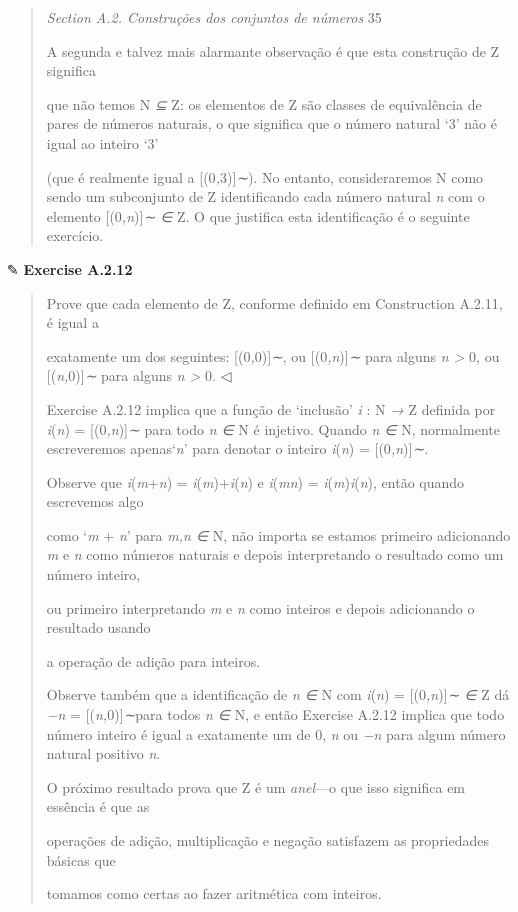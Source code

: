 \documentclass[
]{article}
\begin{document}
\begin{quote}
\emph{Section A.2. Construções dos conjuntos de números} 35

A segunda e talvez mais alarmante observação é que esta construção de Z
significa

que não temos N \emph{⊆} Z: os elementos de Z são classes de
equivalência de pares de números naturais, o que significa que o número
natural `3' não é igual ao inteiro `3'

(que é realmente igual a {[}(0\emph{,}3){]}\emph{∼}). No entanto,
consideraremos N como sendo um subconjunto de Z identificando cada
número natural \emph{n} com o elemento {[}(0\emph{,n}){]}\emph{∼ ∈} Z. O
que justifica esta identificação é o seguinte exercício.
\end{quote}

✎ \textbf{Exercise A.2.12}

\begin{quote}
Prove que cada elemento de Z, conforme definido em Construction A.2.11,
é igual a

exatamente um dos seguintes: {[}(0\emph{,}0){]}\emph{∼}, ou
{[}(0\emph{,n}){]}\emph{∼} para alguns \emph{n \textgreater{}} 0, ou
{[}(\emph{n,}0){]}\emph{∼} para alguns \emph{n \textgreater{}} 0. ◁

Exercise A.2.12 implica que a função de `inclusão' \emph{i} : N \emph{→}
Z definida por \emph{i}(\emph{n}) = {[}(0\emph{,n}){]}\emph{∼} para todo
\emph{n ∈} N é injetivo. Quando \emph{n ∈} N, normalmente escreveremos
apenas`\emph{n}' para denotar o inteiro \emph{i}(\emph{n}) =
{[}(0\emph{,n}){]}\emph{∼}.

Observe que \emph{i}(\emph{m}+\emph{n}) =
\emph{i}(\emph{m})+\emph{i}(\emph{n}) e \emph{i}(\emph{mn}) =
\emph{i}(\emph{m})\emph{i}(\emph{n}), então quando escrevemos algo

como `\emph{m} + \emph{n}' para \emph{m,n ∈} N, não importa se estamos
primeiro adicionando \emph{m} e \emph{n} como números naturais e depois
interpretando o resultado como um número inteiro,

ou primeiro interpretando \emph{m} e \emph{n} como inteiros e depois
adicionando o resultado usando

a operação de adição para inteiros.

Observe também que a identificação de \emph{n ∈} N com
\emph{i}(\emph{n}) = {[}(0\emph{,n}){]}\emph{∼ ∈} Z dá \emph{−n} =
{[}(\emph{n,}0){]}\emph{∼}para todos \emph{n ∈} N, e então Exercise
A.2.12 implica que todo número inteiro é igual a exatamente um de 0,
\emph{n} ou \emph{−n} para algum número natural positivo \emph{n}.

O próximo resultado prova que Z é um \emph{anel}---o que isso significa
em essência é que as

operações de adição, multiplicação e negação satisfazem as propriedades
básicas que

tomamos como certas ao fazer aritmética com inteiros.
\end{quote}
\end{document}

